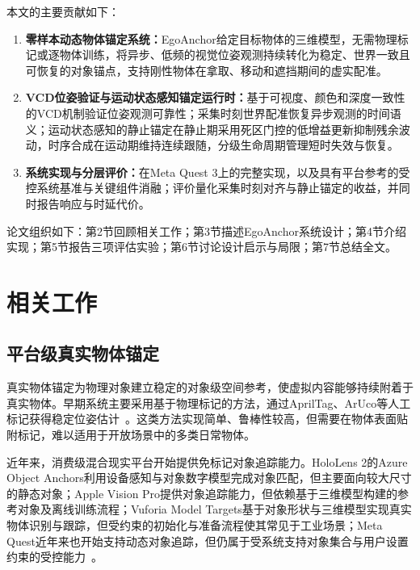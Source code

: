 \documentclass[review]{vgtc}
\begin{document}
本文的主要贡献如下：

\begin{enumerate}
  \item \textbf{零样本动态物体锚定系统：}EgoAnchor给定目标物体的三维模型，无需物理标记或逐物体训练，将异步、低频的视觉位姿观测持续转化为稳定、世界一致且可恢复的对象锚点，支持刚性物体在拿取、移动和遮挡期间的虚实配准。

  \item \textbf{VCD位姿验证与运动状态感知锚定运行时：}基于可视度、颜色和深度一致性的VCD机制验证位姿观测可靠性；采集时刻世界配准恢复异步观测的时间语义；运动状态感知的静止锚定在静止期采用死区门控的低增益更新抑制残余波动，时序合成在运动期维持连续跟随，分级生命周期管理短时失效与恢复。

  \item \textbf{系统实现与分层评价：}在Meta Quest 3上的完整实现，以及具有平台参考的受控系统基准与关键组件消融；评价量化采集时刻对齐与静止锚定的收益，并同时报告响应与时延代价。
\end{enumerate}

论文组织如下：第2节回顾相关工作；第3节描述EgoAnchor系统设计；第4节介绍实现；第5节报告三项评估实验；第6节讨论设计启示与局限；第7节总结全文。

\section{相关工作}\label{sec:related-work}

\subsection{平台级真实物体锚定}

真实物体锚定为物理对象建立稳定的对象级空间参考，使虚拟内容能够持续附着于真实物体。早期系统主要采用基于物理标记的方法，通过AprilTag、ArUco等人工标记获得稳定位姿估计~\cite{kato1999artoolkit,olson2011apriltag,garridojurado2014aruco}。这类方法实现简单、鲁棒性较高，但需要在物体表面贴附标记，难以适用于开放场景中的多类日常物体。

近年来，消费级混合现实平台开始提供免标记对象追踪能力。HoloLens 2的Azure Object Anchors利用设备感知与对象数字模型完成对象匹配，但主要面向较大尺寸的静态对象；Apple Vision Pro提供对象追踪能力，但依赖基于三维模型构建的参考对象及离线训练流程；Vuforia Model Targets基于对象形状与三维模型实现真实物体识别与跟踪，但受约束的初始化与准备流程使其常见于工业场景；Meta Quest近年来也开始支持动态对象追踪，但仍属于受系统支持对象集合与用户设置约束的受控能力~\cite{appleObjectAnchor,azureObjectAnchors,vuforiaModelTargets,metaDynamicObjectTracker}。
\end{document}
